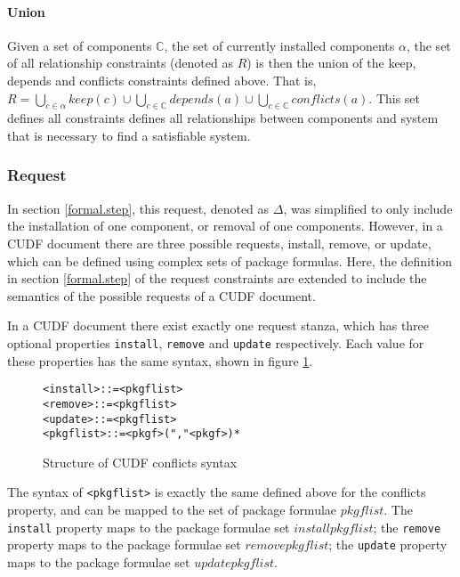 \paragraph{Union}
Given a set of components $\mathbb{C}$, the set of currently installed components $\alpha$, 
the set of all relationship constraints (denoted as $R$) is then the union of the keep, depends and conflicts constraints defined above.
That is, $R = \bigcup \limits_{c \in \alpha} keep(c) \cup \bigcup \limits_{c\in \mathbb{C}} depends(a) \cup \bigcup \limits_{c\in \mathbb{C}} conflicts(a)$.
This set defines all constraints defines all relationships between components and system that is necessary to find a satisfiable system.

\subsubsection{Request}
\label{formal.cudf.request}
In section \ref{formal.step}, this request, denoted as $\Delta$, was simplified to only include the installation of one component, or removal of one components.
However, in a CUDF document there are three possible requests, install, remove, or update, which can be defined using complex sets of package formulas.
Here, the definition in section \ref{formal.step} of the request constraints are extended to include the semantics of the possible requests of a CUDF document.

In a CUDF document there exist exactly one request stanza, which has three optional properties \verb+install+, \verb+remove+ and \verb+update+ respectively.
Each value for these properties has the same syntax, shown in figure \ref{formal.requestssyntax}.

\begin{figure}[htp] 
\begin{center}
\begin{alltt}
<install> ::= <pkgflist>
<remove> ::= <pkgflist>
<update> ::= <pkgflist>
<pkgflist> ::= <pkgf> ("," <pkgf>)*
\end{alltt}
  \caption[CUDF Package conflicts syntax]{Structure of CUDF conflicts syntax}
  \label{formal.requestssyntax}
\end{center}
\end{figure}

The syntax of \verb+<pkgflist>+ is exactly the same defined above for the conflicts property, and can be mapped to the set of package formulae $pkgflist$.
The \verb+install+ property maps to the package formulae set $installpkgflist$; the \verb+remove+ property maps to the package formulae set $removepkgflist$;
the \verb+update+ property maps to the package formulae set  $updatepkgflist$.

